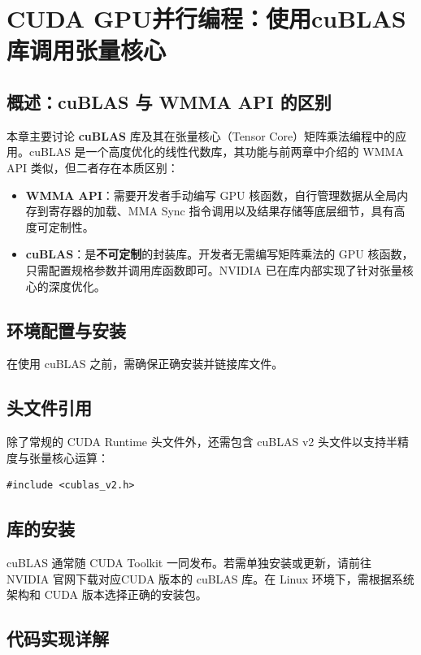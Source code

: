 \section{CUDA GPU并行编程：使用cuBLAS库调用张量核心}
\subsection{概述：cuBLAS 与 WMMA API 的区别}

本章主要讨论 \textbf{cuBLAS} 库及其在张量核心（Tensor Core）矩阵乘法编程中的应用。cuBLAS 是一个高度优化的线性代数库，其功能与前两章中介绍的 WMMA API 类似，但二者存在本质区别：


\begin{itemize}
    \item \textbf{WMMA API}：需要开发者手动编写 GPU 核函数，自行管理数据从全局内存到寄存器的加载、MMA Sync 指令调用以及结果存储等底层细节，具有高度可定制性。
    \item \textbf{cuBLAS}：是\textbf{不可定制}的封装库。开发者无需编写矩阵乘法的 GPU 核函数，只需配置规格参数并调用库函数即可。NVIDIA 已在库内部实现了针对张量核心的深度优化。
\end{itemize}

\subsection{环境配置与安装}

在使用 cuBLAS 之前，需确保正确安装并链接库文件。

\subsection{头文件引用}
除了常规的 CUDA Runtime 头文件外，还需包含 cuBLAS v2 头文件以支持半精度与张量核心运算：
\begin{lstlisting}
#include <cublas_v2.h>
\end{lstlisting}

\subsection{库的安装}
cuBLAS 通常随 CUDA Toolkit 一同发布。若需单独安装或更新，请前往 NVIDIA 官网下载对应CUDA
版本的 cuBLAS 库。在 Linux 环境下，需根据系统架构和 CUDA 版本选择正确的安装包。

\subsection{代码实现详解}

